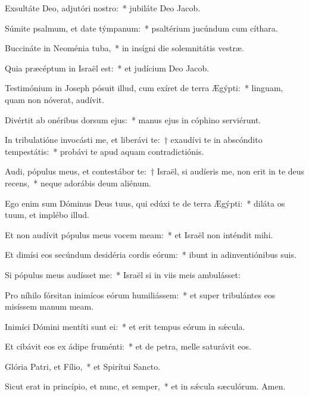 \item Exsultáte Deo, adjutóri nostro:~* jubiláte Deo Jacob.

\item Súmite psalmum, et date týmpanum:~* psaltérium jucúndum cum cíthara.

\item Buccináte in Neoménia tuba,~* in insígni die solemnitátis vestræ.

\item Quia præcéptum in Israël est:~* et judícium Deo Jacob.

\item Testimónium in Joseph pósuit illud, cum exíret de terra Ægýpti:~* linguam, quam non nóverat, audívit.

\item Divértit ab onéribus dorsum ejus:~* manus ejus in cóphino serviérunt.

\item In tribulatióne invocásti me, et liberávi te:~† exaudívi te in abscóndito tempestátis:~* probávi te apud aquam contradictiónis.

\item Audi, pópulus meus, et contestábor te:~† Israël, si audíeris me, non erit in te deus recens,~* neque adorábis deum aliénum.

\item Ego enim sum Dóminus Deus tuus, qui edúxi te de terra Ægýpti:~* diláta os tuum, et implébo illud.

\item Et non audívit pópulus meus vocem meam:~* et Israël non inténdit mihi.

\item Et dimísi eos secúndum desidéria cordis eórum:~* ibunt in adinventiónibus suis.

\item Si pópulus meus audísset me:~* Israël si in viis meis ambulásset:

\item Pro níhilo fórsitan inimícos eórum humiliássem:~* et super tribulántes eos misíssem manum meam.

\item Inimíci Dómini mentíti sunt ei:~* et erit tempus eórum in sǽcula.

\item Et cibávit eos ex ádipe fruménti:~* et de petra, melle saturávit eos.

\item Glória Patri, et Fílio,~* et Spirítui Sancto.

\item Sicut erat in princípio, et nunc, et semper,~* et in sǽcula sæculórum. Amen.

